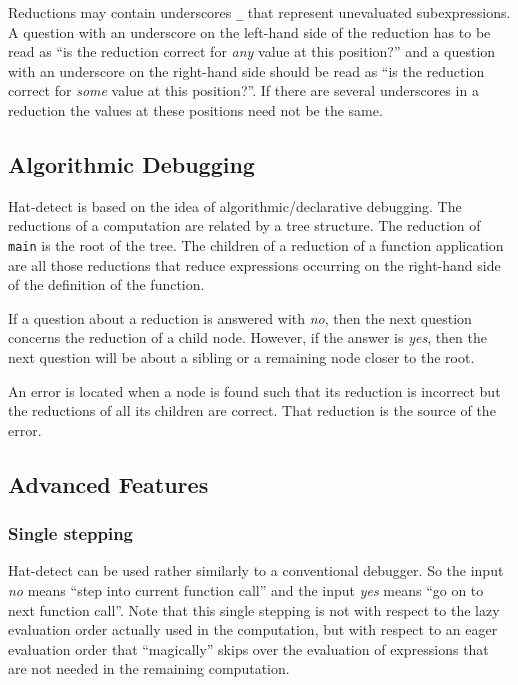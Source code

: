 \documentclass[12pt]{article}
\begin{document}
Reductions may contain underscores \texttt{\_} that represent
unevaluated subexpressions.  A question with an underscore on the
left-hand side of the reduction has to be read as ``is the reduction
correct for \emph{any} value at this position?'' and a question
with an underscore on the right-hand side should be read as ``is the
reduction correct for \emph{some} value at this position?''.  If there
are several underscores in a reduction the values at these positions
need not be the same.

\subsection{Algorithmic Debugging}

Hat-detect is based on the idea of algorithmic/declarative
debugging. The reductions of a computation are related by a tree
structure. The reduction of \texttt{main} is the root of the tree. The
children of a reduction of a function application are all those
reductions that reduce expressions occurring on the right-hand side
of the definition of the function.

If a question about a reduction is answered with \emph{no}, then
the next question concerns the reduction of a child node. However,
if the answer is \emph{yes}, then the next question will be about a
sibling or a remaining node closer to the root.

An error is located when a node is found such that its reduction is
incorrect but the reductions of all its children are correct. That
reduction is the source of the error.

\subsection{Advanced Features}

\subsubsection{Single stepping}

Hat-detect can be used rather similarly to a conventional debugger.
So the input \emph{no} means ``step into current function call''
and the input \emph{yes} means ``go on to next function call''. Note
that this single stepping is not with respect to the lazy evaluation
order actually used in the computation, but with respect to an eager
evaluation order that ``magically'' skips over the evaluation of
expressions that are not needed in the remaining computation.
\end{document}
